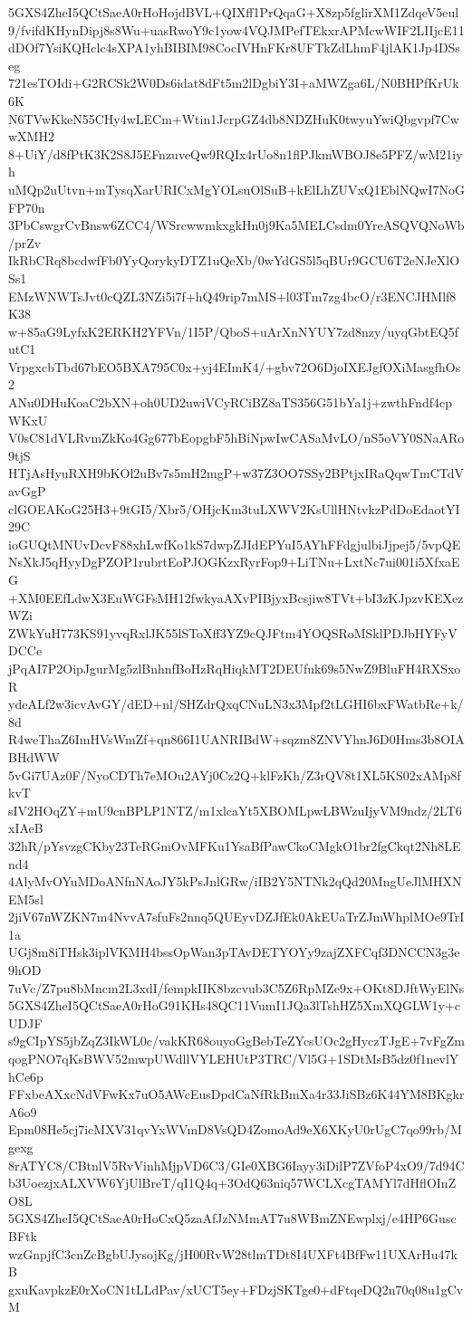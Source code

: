 5GXS4ZheI5QCtSaeA0rHoHojdBVL+QIXff1PrQqaG+X8zp5fglirXM1ZdqeV5eul
9/fvifdKHynDipj8s8Wu+uasRwoY9c1yow4VQJMPefTEkxrAPMcwWIF2LIIjcE11
dDOf7YsiKQHclc4sXPA1yhBIBIM98CocIVHnFKr8UFTkZdLhmF4jlAK1Jp4DSseg
721esTOIdi+G2RCSk2W0Ds6idat8dFt5m2lDgbiY3I+aMWZga6L/N0BHPfKrUk6K
N6TVwKkeN55CHy4wLECm+Wtin1JcrpGZ4db8NDZHuK0twyuYwiQbgvpf7CwwXMH2
8+UiY/d8fPtK3K2S8J5EFnzuveQw9RQIx4rUo8n1flPJkmWBOJ8e5PFZ/wM21iyh
uMQp2uUtvn+mTysqXarURICxMgYOLsuOlSuB+kElLhZUVxQ1EblNQwI7NoGFP70n
3PbCswgrCvBnsw6ZCC4/WSrcwwmkxgkHn0j9Ka5MELCsdm0YreASQVQNoWb/prZv
IkRbCRq8bcdwfFb0YyQorykyDTZ1uQeXb/0wYdGS5l5qBUr9GCU6T2eNJeXlOSs1
EMzWNWTsJvt0cQZL3NZi5i7f+hQ49rip7mMS+l03Tm7zg4bcO/r3ENCJHMlf8K38
w+85aG9LyfxK2ERKH2YFVn/1I5P/QboS+uArXnNYUY7zd8nzy/uyqGbtEQ5futC1
VrpgxcbTbd67bEO5BXA795C0x+yj4EImK4/+gbv72O6DjoIXEJgfOXiMasgfhOs2
ANu0DHuKoaC2bXN+oh0UD2uwiVCyRCiBZ8aTS356G51bYa1j+zwthFndf4cpWKxU
V0sC81dVLRvmZkKo4Gg677bEopgbF5hBiNpwIwCASaMvLO/nS5oVY0SNaARo9tjS
HTjAsHyuRXH9bKOl2uBv7s5mH2mgP+w37Z3OO7SSy2BPtjxIRaQqwTmCTdVavGgP
clGOEAKoG25H3+9tGI5/Xbr5/OHjcKm3tuLXWV2KsUllHNtvkzPdDoEdaotYI29C
ioGUQtMNUvDcvF88xhLwfKo1kS7dwpZJIdEPYuI5AYhFFdgjulbiJjpej5/5vpQE
NsXkJ5qHyyDgPZOP1rubrtEoPJOGKzxRyrFop9+LiTNu+LxtNc7ui001i5XfxaEG
+XM0EEfLdwX3EuWGFsMH12fwkyaAXvPIBjyxBcsjiw8TVt+bI3zKJpzvKEXezWZi
ZWkYuH773KS91yvqRxlJK55lSToXff3YZ9cQJFtm4YOQSRoMSklPDJbHYFyVDCCe
jPqAI7P2OipJgurMg5zlBnhnfBoHzRqHiqkMT2DEUfuk69s5NwZ9BluFH4RXSxoR
ydeALf2w3icvAvGY/dED+nl/SHZdrQxqCNuLN3x3Mpf2tLGHI6bxFWatbRe+k/8d
R4weThaZ6ImHVsWmZf+qn866I1UANRIBdW+sqzm8ZNVYhnJ6D0Hms3b8OIABHdWW
5vGi7UAz0F/NyoCDTh7eMOu2AYj0Cz2Q+klFzKh/Z3rQV8t1XL5KS02xAMp8fkvT
sIV2HOqZY+mU9cnBPLP1NTZ/m1xlcaYt5XBOMLpwLBWzuIjyVM9ndz/2LT6xIAeB
32hR/pYsvzgCKby23TeRGmOvMFKu1YsaBfPawCkoCMgkO1br2fgCkqt2Nh8LEnd4
4AlyMvOYuMDoANfnNAoJY5kPsJnlGRw/iIB2Y5NTNk2qQd20MngUeJlMHXNEM5sl
2jiV67nWZKN7m4NvvA7sfuFs2nnq5QUEyvDZJfEk0AkEUaTrZJmWhplMOe9TrI1a
UGj8m8iTHsk3iplVKMH4bssOpWan3pTAvDETYOYy9zajZXFCqf3DNCCN3g3e9hOD
7uVc/Z7pu8bMncm2L3xdI/fempkIIK8bzcvub3C5Z6RpMZe9x+OKt8DJftWyElNs
5GXS4ZheI5QCtSaeA0rHoG91KHs48QC11VumI1JQa3lTshHZ5XmXQGLW1y+cUDJF
s9gCIpYS5jbZqZ3IkWL0c/vakKR68ouyoGgBebTeZYcsUOc2gHyczTJgE+7vFgZm
qogPNO7qKsBWV52mwpUWdllVYLEHUtP3TRC/Vl5G+1SDtMsB5dz0f1nevlYhCe6p
FFxbeAXxcNdVFwKx7uO5AWcEusDpdCaNfRkBmXa4r33JiSBz6K44YM8BKgkrA6o9
Epm08He5cj7icMXV31qvYxWVmD8VsQD4ZomoAd9eX6XKyU0rUgC7qo99rb/Mgexg
8rATYC8/CBtnlV5RvVinhMjpVD6C3/GIe0XBG6Iayy3iDilP7ZVfoP4xO9/7d94C
b3UoezjxALXVW6YjUlBreT/qI1Q4q+3OdQ63niq57WCLXcgTAMYl7dHflOInZO8L
5GXS4ZheI5QCtSaeA0rHoCxQ5zaAfJzNMmAT7u8WBmZNEwplxj/e4HP6GuscBFtk
wzGnpjfC3cnZcBgbUJysojKg/jH00RvW28tlmTDt8I4UXFt4BfFw11UXArHu47kB
gxuKavpkzE0rXoCN1tLLdPav/xUCT5ey+FDzjSKTge0+dFtqeDQ2n70q08u1gCvM
